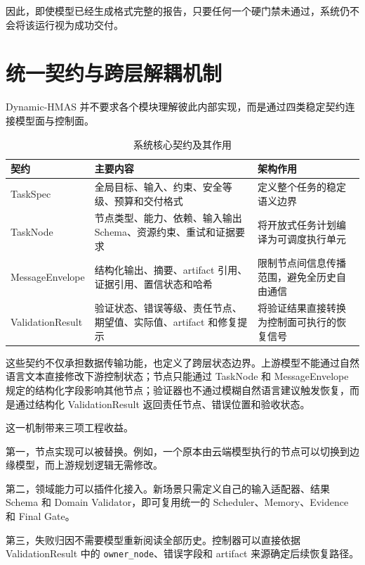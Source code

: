 \documentclass[UTF8,a4paper,12pt,oneside]{ctexbook}
\begin{document}
因此，即使模型已经生成格式完整的报告，只要任何一个硬门禁未通过，系统仍不会将该运行视为成功交付。


\section{统一契约与跨层解耦机制}

Dynamic-HMAS 并不要求各个模块理解彼此内部实现，而是通过四类稳定契约连接模型面与控制面。

\begin{table}[htbp]
\centering
\caption{系统核心契约及其作用}
\label{tab:core-contracts}
\begin{tabularx}{0.96\textwidth}{p{}X p{}}
\toprule
契约 & 主要内容 & 架构作用\\
\midrule
TaskSpec
& 全局目标、输入、约束、安全等级、预算和交付格式
& 定义整个任务的稳定语义边界\\

TaskNode
& 节点类型、能力、依赖、输入输出 Schema、资源约束、重试和证据要求
& 将开放式任务计划编译为可调度执行单元\\

MessageEnvelope
& 结构化输出、摘要、artifact 引用、证据引用、置信状态和哈希
& 限制节点间信息传播范围，避免全历史自由通信\\

ValidationResult
& 验证状态、错误等级、责任节点、期望值、实际值、artifact 和修复提示
& 将验证结果直接转换为控制面可执行的恢复信号\\
\bottomrule
\end{tabularx}
\end{table}

这些契约不仅承担数据传输功能，也定义了跨层状态边界。上游模型不能通过自然语言文本直接修改下游控制状态；节点只能通过 TaskNode 和 MessageEnvelope 规定的结构化字段影响其他节点；验证器也不通过模糊自然语言建议触发恢复，而是通过结构化 ValidationResult 返回责任节点、错误位置和验收状态。

这一机制带来三项工程收益。

第一，节点实现可以被替换。例如，一个原本由云端模型执行的节点可以切换到边缘模型，而上游规划逻辑无需修改。

第二，领域能力可以插件化接入。新场景只需定义自己的输入适配器、结果 Schema 和 Domain Validator，即可复用统一的 Scheduler、Memory、Evidence 和 Final Gate。

第三，失败归因不需要模型重新阅读全部历史。控制器可以直接依据 ValidationResult 中的 \texttt{owner\_node}、错误字段和 artifact 来源确定后续恢复路径。
\end{document}
